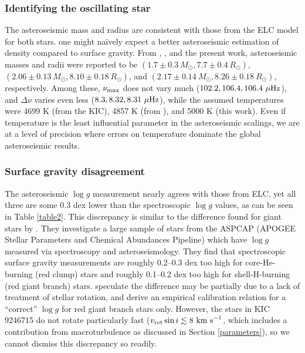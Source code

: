 \subsubsection{Identifying the oscillating star}\label{identifying}
The asteroseismic mass and radius are consistent with those from the ELC model for both stars.  one might na{\"i}vely expect a better asteroseismic estimation of density compared to surface gravity.  From \citet{gau13}, \citet{gau14}, and the present work, asteroseismic masses and radii were reported to be $(1.7 \pm 0.3 \ M_\odot, 7.7 \pm 0.4 \ R_\odot)$, $(2.06 \pm 0.13 \ M_\odot, 8.10 \pm 0.18 \ R_\odot)$, and $(2.17 \pm 0.14 \ M_\odot, 8.26 \pm 0.18 \ R_\odot)$, respectively. Among these, $\nu_{\rm{max}}$ does not vary much ($102.2, 106.4, 106.4 \ \mu\rm{Hz}$), and $\Delta \nu$ varies even less ($8.3, 8.32, 8.31 \ \mu\rm{Hz}$), while the assumed temperatures were 4699 K (from the KIC), 4857 K (from \citealt{hub14.2}), and 5000 K (this work). Even if temperature is the least influential parameter in the asteroseismic scalings, we are at a level of precision where errors on temperature dominate the global asteroseismic results. 

\subsubsection{Surface gravity disagreement}\label{gravity_compare}
The asteroseismic $\log g$ measurement nearly agrees with those from ELC, yet all three are some 0.3 dex lower than the spectroscopic $\log g$ values, as can be seen in Table \ref{table2}. This discrepancy is similar to the difference found for giant stars by \citet{hol15}. They investigate a large sample of stars from the ASPCAP (APOGEE Stellar Parameters and Chemical Abundances Pipeline) which have $\log g$ measured via spectroscopy and asteroseismology. They find that spectroscopic surface gravity measurements are roughly 0.2--0.3 dex too high for core-He-burning (red clump) stars and roughly 0.1--0.2 dex too high for shell-H-burning (red giant branch) stars. \citet{hol15} speculate the difference may be partially due to a lack of treatment of stellar rotation, and derive an empirical calibration relation for a ``correct'' $\log g$ for red giant branch stars only. However, the stars in KIC 9246715 do not rotate particularly fast ($v_{\rm{rot}} \sin i \lesssim 8 \ \rm{km \ s}^{-1}$, which includes a contribution from macroturbulence as discussed in Section \ref{parameters}), so we cannot dismiss this discrepancy so readily.
